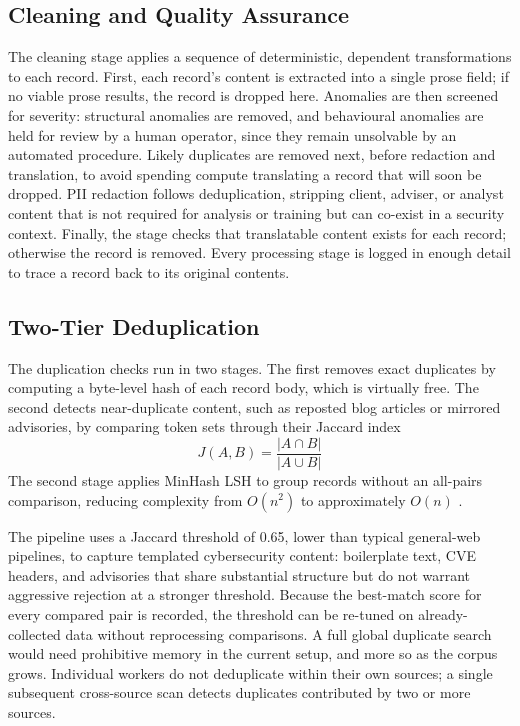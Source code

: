 \documentclass[conference]{IEEEtran}
\begin{document}
\subsection{Cleaning and Quality Assurance}

The cleaning stage applies a sequence of deterministic, dependent transformations to each record. First, each record's content is extracted into a single prose field; if no viable prose results, the record is dropped here. Anomalies are then screened for severity: structural anomalies are removed, and behavioural anomalies are held for review by a human operator, since they remain unsolvable by an automated procedure. Likely duplicates are removed next, before redaction and translation, to avoid spending compute translating a record that will soon be dropped. PII redaction follows deduplication, stripping client, adviser, or analyst content that is not required for analysis or training but can co-exist in a security context. Finally, the stage checks that translatable content exists for each record; otherwise the record is removed. Every processing stage is logged in enough detail to trace a record back to its original contents.

\subsection{Two-Tier Deduplication}

The duplication checks run in two stages. The first removes exact duplicates by computing a byte-level hash of each record body, which is virtually free. The second detects near-duplicate content, such as reposted blog articles or mirrored advisories, by comparing token sets through their Jaccard index
\begin{equation}
  J(A, B) = \frac{|A \cap B|}{|A \cup B|}
\end{equation}
The second stage applies MinHash LSH \cite{leskovec2014mmd} to group records without an all-pairs comparison, reducing complexity from $O(n^2)$ to approximately $O(n)$ \cite{leskovec2014mmd}.

The pipeline uses a Jaccard threshold of 0.65, lower than typical general-web pipelines, to capture templated cybersecurity content: boilerplate text, CVE headers, and advisories that share substantial structure but do not warrant aggressive rejection at a stronger threshold. Because the best-match score for every compared pair is recorded, the threshold can be re-tuned on already-collected data without reprocessing comparisons. A full global duplicate search would need prohibitive memory in the current setup, and more so as the corpus grows. Individual workers do not deduplicate within their own sources; a single subsequent cross-source scan detects duplicates contributed by two or more sources.
\end{document}
